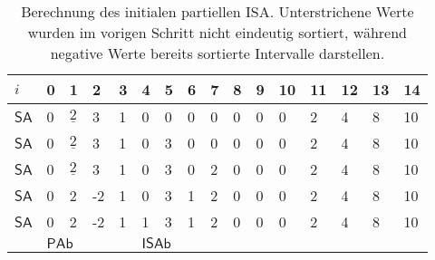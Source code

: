 \begin{table}
	\begin{tabular}{l|llll|llll|lllllll}
		$i$  & 0 & 1                         & 2                          & 3 & 4                         & 5                         & 6                         & 7                         & 8 & 9 & 10 & 11 & 12 & 13 & 14 \\ \hline
		$\mathsf{SA}$ & 0 & $\underline{2}$           & 3                          & 1 & 0                         & 0                         & 0                         & 0                         & 0 & 0 & 0  & 2  & 4  & 8  & 10 \\ \hline
		$\mathsf{SA}$ & 0 & $\underline{2}$           & 3                          & 1 & 0                         & \cellcolor[HTML]{32CB00}3 & 0                         & 0                         & 0 & 0 & 0  & 2  & 4  & 8  & 10 \\ \hline
		$\mathsf{SA}$ & 0 & $\underline{2}$           & 3                          & 1 & 0                         & 3                         & 0                         & \cellcolor[HTML]{32CB00}2 & 0 & 0 & 0  & 2  & 4  & 8  & 10 \\ \hline
		$\mathsf{SA}$ & 0 & \cellcolor[HTML]{34CDF9}2 & \cellcolor[HTML]{32CB00}-2 & 1 & 0                         & 3                         & \cellcolor[HTML]{32CB00}1 & 2                         & 0 & 0 & 0  & 2  & 4  & 8  & 10 \\ \hline
		$\mathsf{SA}$ & 0 & 2                         & -2                         & 1 & \cellcolor[HTML]{32CB00}1 & 3                         & 1                         & 2                         & 0 & 0 & 0  & 2  & 4  & 8  & 10 \\ \hline
		& \multicolumn{4}{l|}{$\mathsf{PAb}$}                                       & \multicolumn{4}{l|}{$\mathsf{ISAb}$}                                                                                     &   &   &    &    &    &    &   
	\end{tabular}
	\caption{Berechnung des initialen partiellen ISA. Unterstrichene Werte wurden im vorigen Schritt nicht eindeutig sortiert, während negative Werte bereits sortierte Intervalle darstellen.}
	\label{dss:table:isa}
\end{table}

